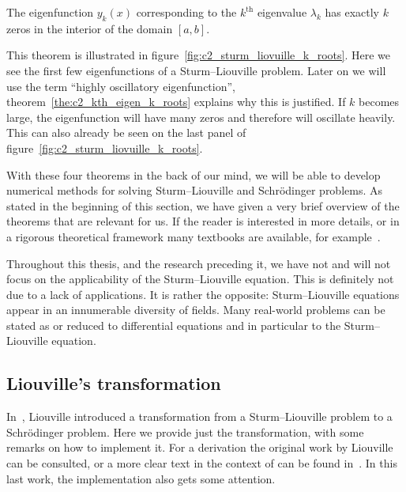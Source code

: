 \begin{theorem}\label{the:c2_kth_eigen_k_roots}
    The eigenfunction $y_k(x)$ corresponding to the $k^{\text{th}}$ eigenvalue $\lambda_k$ has exactly $k$ zeros in the interior of the domain $\left[a, b\right]$.
\end{theorem}

This theorem is illustrated in figure~\ref{fig:c2_sturm_liovuille_k_roots}. Here we see the first few eigenfunctions of a Sturm--Liouville problem. Later on we will use the term ``highly oscillatory eigenfunction'', theorem~\ref{the:c2_kth_eigen_k_roots} explains why this is justified. If $k$ becomes large, the eigenfunction will have many zeros and therefore will oscillate heavily. This can also already be seen on the last panel of figure~\ref{fig:c2_sturm_liovuille_k_roots}.

With these four theorems in the back of our mind, we will be able to develop numerical methods for solving Sturm--Liouville and Schrödinger problems. As stated in the beginning of this section, we have given a very brief overview of the theorems that are relevant for us. If the reader is interested in more details, or in a rigorous theoretical framework many textbooks are available, for example~\cite{sagan_boundary_1961,al-gwaiz_sturmliouville_2008,zettl_sturmliouville_2012,guenther_sturmliouville_2018}.

Throughout this thesis, and the research preceding it, we have not and will not focus on the applicability of the Sturm--Liouville equation. This is definitely not due to a lack of applications. It is rather the opposite: Sturm--Liouville equations appear in an innumerable diversity of fields. Many real-world problems can be stated as or reduced to differential equations and in particular to the Sturm--Liouville equation.


\subsection{Liouville's transformation}\label{sec:c2_liouville_transformation}

In~\cite{liouville_second_1837}, Liouville introduced a transformation from a Sturm--Liouville problem to a Schrödinger problem. Here we provide just the transformation, with some remarks on how to implement it. For a derivation the original work by Liouville~\cite{liouville_second_1837} can be consulted, or a more clear text in the context of \matslise{} can be found in~\cite{ledoux_study_2007}. In this last work, the implementation also gets some attention.

